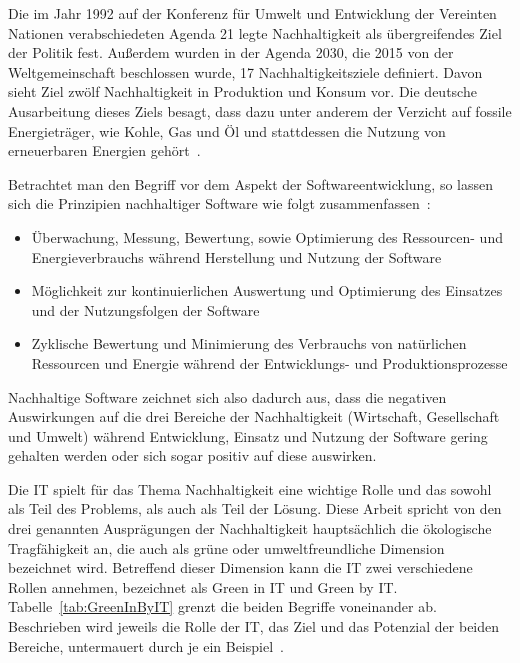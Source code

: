 Die im Jahr 1992 auf der Konferenz für Umwelt und Entwicklung der Vereinten Nationen verabschiedeten Agenda 21 legte Nachhaltigkeit als übergreifendes Ziel der Politik fest.
Außerdem wurden in der Agenda 2030, die 2015 von der Weltgemeinschaft beschlossen wurde, 17 Nachhaltigkeitsziele definiert.
Davon sieht Ziel zwölf Nachhaltigkeit in Produktion und Konsum vor.
Die deutsche Ausarbeitung dieses Ziels besagt, dass dazu unter anderem der Verzicht auf fossile Energieträger, wie Kohle, Gas und Öl und stattdessen die Nutzung von erneuerbaren Energien gehört~\cite{Bundesregierunginformiert}.

Betrachtet man den Begriff vor dem Aspekt der Softwareentwicklung, so lassen sich die Prinzipien nachhaltiger Software wie folgt zusammenfassen~\cite{Calero.2015}:
\begin{itemize}
 \item Überwachung, Messung, Bewertung, sowie Optimierung des Ressourcen- und Energieverbrauchs während Herstellung und Nutzung der Software
\item Möglichkeit zur kontinuierlichen Auswertung und Optimierung des Einsatzes und der Nutzungsfolgen der Software
\item Zyklische Bewertung und Minimierung des Verbrauchs von natürlichen Ressourcen und Energie während der Entwicklungs- und Produktionsprozesse
\end{itemize}
Nachhaltige Software zeichnet sich also dadurch aus, dass die negativen Auswirkungen auf die drei Bereiche der Nachhaltigkeit (Wirtschaft, Gesellschaft und Umwelt) während Entwicklung, Einsatz und Nutzung der Software gering gehalten werden oder sich sogar positiv auf diese auswirken.

Die \ac{IT} spielt für das Thema Nachhaltigkeit eine wichtige Rolle und das sowohl als Teil des Problems, als auch als Teil der Lösung.
Diese Arbeit spricht von den drei genannten Ausprägungen der Nachhaltigkeit hauptsächlich die ökologische Tragfähigkeit an, die auch als \glqq grüne\grqq{} oder \glqq umweltfreundliche\grqq{} Dimension bezeichnet wird.
Betreffend dieser Dimension kann die \ac{IT} zwei verschiedene Rollen annehmen, bezeichnet als Green in \ac{IT} und Green by \ac{IT}\@.
Tabelle~\ref{tab:GreenInByIT} grenzt die beiden Begriffe voneinander ab.
Beschrieben wird jeweils die Rolle der \ac{IT}, das Ziel und das Potenzial der beiden Bereiche, untermauert durch je ein Beispiel~\cite{Calero.2015}.

